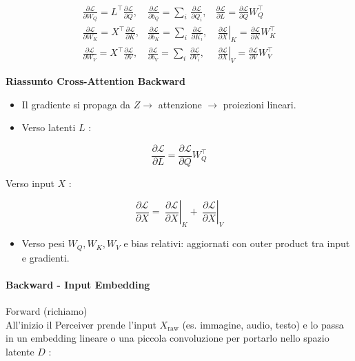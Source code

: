 \documentclass[
  11pt,
]{article}
\begin{document}
\[\begin{matrix}
\frac{\partial\mathcal{L}}{\partial W_{Q}} = L^{\top}\frac{\partial\mathcal{L}}{\partial Q}, & \frac{\partial\mathcal{L}}{\partial b_{Q}} = \sum_{i}^{}\,\frac{\partial\mathcal{L}}{\partial Q_{i}}, & \frac{\partial\mathcal{L}}{\partial L} = \frac{\partial\mathcal{L}}{\partial Q}W_{Q}^{\top} \\
\frac{\partial\mathcal{L}}{\partial W_{K}} = X^{\top}\frac{\partial\mathcal{L}}{\partial K}, & \frac{\partial\mathcal{L}}{\partial b_{K}} = \sum_{i}^{}\,\frac{\partial\mathcal{L}}{\partial K_{i}}, & \left. \ \frac{\partial\mathcal{L}}{\partial X} \right|_{K} = \frac{\partial\mathcal{L}}{\partial K}W_{K}^{\top} \\
\frac{\partial\mathcal{L}}{\partial W_{V}} = X^{\top}\frac{\partial\mathcal{L}}{\partial V}, & \frac{\partial\mathcal{L}}{\partial b_{V}} = \sum_{i}^{}\,\frac{\partial\mathcal{L}}{\partial V_{i}}, & \left. \ \frac{\partial\mathcal{L}}{\partial X} \right|_{V} = \frac{\partial\mathcal{L}}{\partial V}W_{V}^{\top}
\end{matrix}\]

\textbf{Riassunto Cross-Attention Backward}

\begin{itemize}
\item
  Il gradiente si propaga da \(Z \rightarrow\) attenzione
  \(\rightarrow\) proiezioni lineari.
\item
  Verso latenti \(L\) :
\end{itemize}

\[\frac{\partial\mathcal{L}}{\partial L} = \frac{\partial\mathcal{L}}{\partial Q}W_{Q}^{\top}\]

Verso input \(X\) :

\[\frac{\partial\mathcal{L}}{\partial X} = \left. \ \frac{\partial\mathcal{L}}{\partial X} \right|_{K} + \left. \ \frac{\partial\mathcal{L}}{\partial X} \right|_{V}\]

\begin{itemize}
\item
  Verso pesi \(W_{Q},W_{K},W_{V}\) e bias relativi: aggiornati con outer
  product tra input e gradienti.
\end{itemize}

\paragraph{Backward - Input Embedding}
Forward (richiamo)\\
All'inizio il Perceiver prende l'input
\(X_{\text{raw}}\) (es. immagine, audio, testo) e lo passa in un
embedding lineare o una piccola convoluzione per portarlo nello spazio
latente \(D\) :
\end{document}
